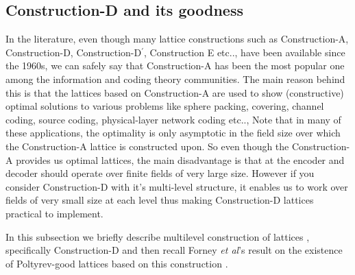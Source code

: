 \subsection{Construction-D and its goodness}
In the literature, even though many lattice constructions such as Construction-A, Construction-D, Construction-D$^\prime$, Construction E etc.., have been available  since the 1960s, we can safely say that Construction-A has been the most popular one among the information and coding theory communities. The main reason behind this is that the lattices based on Construction-A are used to show (constructive) optimal solutions to various problems like sphere packing, covering, channel coding, source coding, physical-layer network coding etc.., Note that in many of these applications, the optimality is only asymptotic in the field size over which the Construction-A lattice is constructed upon. So even though the Construction-A provides us optimal lattices, the main disadvantage is that at the encoder and decoder should operate over finite fields of very large size. However if you consider Construction-D with it's multi-level structure, it enables us to work over fields of very small size at each level thus making Construction-D lattices practical to implement.

 In this subsection we briefly describe multilevel construction of lattices \cite{BarnesSloane83,conwaysphere}, specifically Construction-D and then recall Forney {\em et al}'s result on the existence of Poltyrev-good lattices based on this construction \cite{forney2000}.

